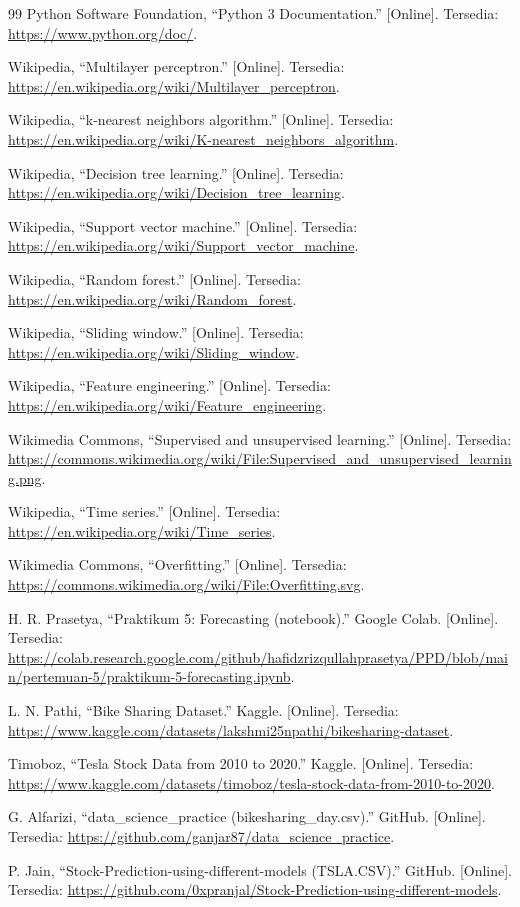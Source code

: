 \documentclass[a4paper,oneside,12pt]{report}
\begin{document}
\begin{thebibliography}{99}
     Python Software Foundation, ``Python 3 Documentation.'' [Online]. Tersedia: \url{https://www.python.org/doc/}.

     Wikipedia, ``Multilayer perceptron.'' [Online]. Tersedia: \url{https://en.wikipedia.org/wiki/Multilayer_perceptron}.

     Wikipedia, ``k-nearest neighbors algorithm.'' [Online]. Tersedia: \url{https://en.wikipedia.org/wiki/K-nearest_neighbors_algorithm}.

     Wikipedia, ``Decision tree learning.'' [Online]. Tersedia: \url{https://en.wikipedia.org/wiki/Decision_tree_learning}.

     Wikipedia, ``Support vector machine.'' [Online]. Tersedia: \url{https://en.wikipedia.org/wiki/Support_vector_machine}.

     Wikipedia, ``Random forest.'' [Online]. Tersedia: \url{https://en.wikipedia.org/wiki/Random_forest}.

     Wikipedia, ``Sliding window.'' [Online]. Tersedia: \url{https://en.wikipedia.org/wiki/Sliding_window}.

     Wikipedia, ``Feature engineering.'' [Online]. Tersedia: \url{https://en.wikipedia.org/wiki/Feature_engineering}.

     Wikimedia Commons, ``Supervised and unsupervised learning.'' [Online]. Tersedia: \url{https://commons.wikimedia.org/wiki/File:Supervised_and_unsupervised_learning.png}.

     Wikipedia, ``Time series.'' [Online]. Tersedia: \url{https://en.wikipedia.org/wiki/Time_series}.

     Wikimedia Commons, ``Overfitting.'' [Online]. Tersedia: \url{https://commons.wikimedia.org/wiki/File:Overfitting.svg}.

     H. R. Prasetya, ``Praktikum 5: Forecasting (notebook).'' Google Colab. [Online]. Tersedia: \url{https://colab.research.google.com/github/hafidzrizqullahprasetya/PPD/blob/main/pertemuan-5/praktikum-5-forecasting.ipynb}.

     L. N. Pathi, ``Bike Sharing Dataset.'' Kaggle. [Online]. Tersedia: \url{https://www.kaggle.com/datasets/lakshmi25npathi/bikesharing-dataset}.

     Timoboz, ``Tesla Stock Data from 2010 to 2020.'' Kaggle. [Online]. Tersedia: \url{https://www.kaggle.com/datasets/timoboz/tesla-stock-data-from-2010-to-2020}.

     G. Alfarizi, ``data\_science\_practice (bikesharing\_day.csv).'' GitHub. [Online]. Tersedia: \url{https://github.com/ganjar87/data_science_practice}.

     P. Jain, ``Stock-Prediction-using-different-models (TSLA.CSV).'' GitHub. [Online]. Tersedia: \url{https://github.com/0xpranjal/Stock-Prediction-using-different-models}.

\end{thebibliography}
\end{document}
